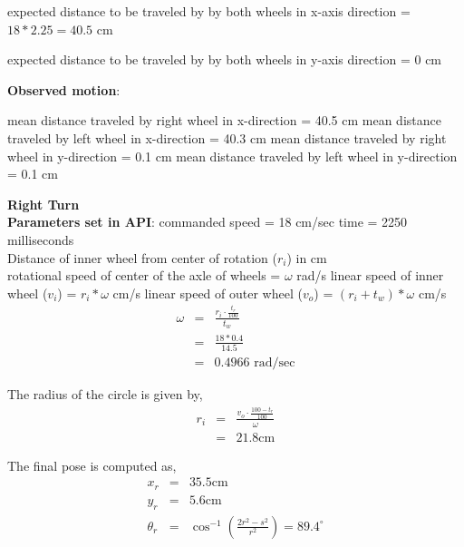 expected distance to be traveled by by both wheels in x-axis direction = $ 18 * 2.25 = 40.5$ cm 
	
expected distance to be traveled by by both wheels in y-axis direction = $0$ cm
	
	
	\textbf{Observed motion}:
	
	mean distance traveled by right wheel in x-direction = 40.5 cm
	mean distance traveled by left wheel in x-direction = 40.3 cm 
	mean distance traveled by right wheel in y-direction = 0.1 cm 
	mean distance traveled by left wheel in y-direction = 0.1 cm 
	
	\item \textbf{Right Turn} \\
	\textbf{Parameters set in API}: \newline
	commanded speed = 18 cm/sec \newline
	time = 2250 milliseconds \newline
	\\
	
	Distance of inner wheel from center of rotation ($r_i$) in cm \\ 
	rotational speed of center of the axle of wheels = $\omega$ rad/s \newline
	linear speed of inner wheel ($v_i$) = $r_i * \omega$ cm/s \newline
	linear speed of outer wheel ($v_o$) = $(r_i + t_w ) * \omega$ cm/s \newline
\begin{equation}
\begin{array}{rcl}
\omega &=& \frac{r_i \cdot \frac{t_r}{100}}{t_w} \\
 &=& \frac{18 * 0.4}{14.5} \\
 &=& 0.4966 \text{ rad/sec}
\end{array}
\end{equation}

The radius of the circle is given by,
\begin{equation}
\begin{array}{rcl}
r_i &=& \frac{v_o \cdot \frac{100 - t_r}{100}}{\omega} \\
&=& 21.8 \text{cm}
\end{array}
\end{equation}

The final pose is computed as,
\begin{equation}
\begin{array}{rcl}
x_r &=& 35.5 \text{cm} \\
y_r &=& 5.6 \text{cm} \\
\theta_r &=& \cos^{-1}\left(\frac{2r^2 - s^2}{r^2}\right) = 89.4^{\circ}
\end{array}
\end{equation}

